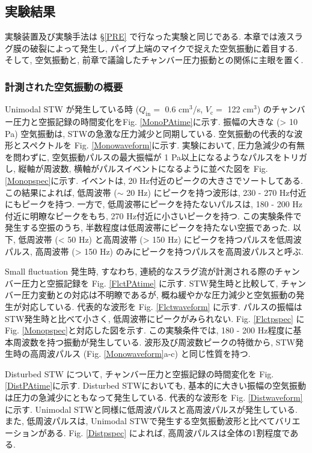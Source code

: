 \documentclass[12pt]{article}
\begin{document}
\clearpage \newpage
\subsection{実験結果}\label{ACOresult}
実験装置及び実験手法は \S \ref{PRE} で行なった実験と同じである. 本章では液スラグ膜の破裂によって発生し, パイプ上端のマイクで捉えた空気振動に着目する. そして, 空気振動と, 前章で議論したチャンバー圧力振動との関係に主眼を置く.  

\subsubsection{計測された空気振動の概要}
Unimodal STW が発生している時 ($Q_\mathrm{in}=$ 0.6 cm$^3$/s, $V_\mathrm{c}=$ 122 cm$^3$) のチャンバー圧力と空振記録の時間変化をFig. \ref{MonoPAtime}に示す. 
振幅の大きな (> 10 Pa) 空気振動は, STWの急激な圧力減少と同期している.
空気振動の代表的な波形とスペクトルを Fig. \ref{Monowaveform}に示す. 実験において, 圧力急減少の有無を問わずに, 空気振動パルスの最大振幅が 1 Pa以上になるようなパルスをトリガし, 縦軸が周波数, 横軸がパルスイベントになるように並べた図を Fig. \ref{Monopspec}に示す. イベントは, 20 Hz付近のピークの大きさでソートしてある.  この結果によれば, 低周波帯 ($\sim$ 20 Hz) にピークを持つ波形は, 230 - 270 Hz付近にもピークを持つ. 一方で, 低周波帯にピークを持たないパルスは, 180 - 200 Hz付近に明瞭なピークをもち, 270 Hz付近に小さいピークを持つ. この実験条件で発生する空振のうち, 半数程度は低周波帯にピークを持たない空振であった. 以下, 低周波帯 (< 50 Hz) と高周波帯 (> 150 Hz) にピークを持つパルスを低周波パルス, 高周波帯 (> 150 Hz) のみにピークを持つパルスを高周波パルスと呼ぶ. 

Small fluctuation 発生時, すなわち, 連続的なスラグ流が計測される際のチャンバー圧力と空振記録を Fig. \ref{FlctPAtime} に示す.  STW発生時と比較して, チャンバー圧力変動との対応は不明瞭であるが, 概ね緩やかな圧力減少と空気振動の発生が対応している. 代表的な波形を Fig. \ref{Flctwaveform} に示す. パルスの振幅はSTW発生時と比べて小さく, 低周波帯にピークがみられない. Fig. \ref{Flctpspec} に Fig. \ref{Monopspec}と対応した図を示す. この実験条件では, 180 - 200 Hz程度に基本周波数を持つ振動が発生している. 波形及び周波数ピークの特徴から, STW発生時の高周波パルス (Fig. \ref{Monowaveform}a-c) と同じ性質を持つ. 

Disturbed STW について, チャンバー圧力と空振記録の時間変化を Fig. \ref{DistPAtime}に示す. Disturbed STWにおいても, 基本的に大きい振幅の空気振動は圧力の急減少にともなって発生している. 代表的な波形を Fig. \ref{Distwaveform} に示す. Unimodal STWと同様に低周波パルスと高周波パルスが発生している. また, 低周波パルスは, Unimodal STWで発生する空気振動波形と比べてバリエーションがある. Fig. \ref{Distpspec} によれば, 高周波パルスは全体の1割程度である. 
\end{document}
